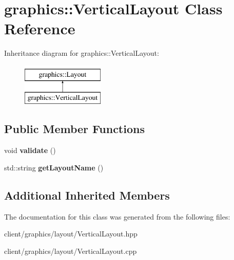 \hypertarget{classgraphics_1_1_vertical_layout}{\section{graphics\-:\-:Vertical\-Layout Class Reference}
\label{classgraphics_1_1_vertical_layout}
}
Inheritance diagram for graphics\-:\-:Vertical\-Layout\-:\begin{figure}[H]
\begin{center}
\leavevmode
\includegraphics[height=2.000000cm]{classgraphics_1_1_vertical_layout}
\end{center}
\end{figure}
\subsection*{Public Member Functions}
\begin{DoxyCompactItemize}
\item 
\hypertarget{classgraphics_1_1_vertical_layout_a5d38d25643909411dd9940c3dd179f0a}{void {\bfseries validate} ()}\label{classgraphics_1_1_vertical_layout_a5d38d25643909411dd9940c3dd179f0a}

\item 
\hypertarget{classgraphics_1_1_vertical_layout_a63b44c865f36b88bd0d54a63df880063}{std\-::string {\bfseries get\-Layout\-Name} ()}\label{classgraphics_1_1_vertical_layout_a63b44c865f36b88bd0d54a63df880063}

\end{DoxyCompactItemize}
\subsection*{Additional Inherited Members}


The documentation for this class was generated from the following files\-:\begin{DoxyCompactItemize}
\item 
client/graphics/layout/Vertical\-Layout.\-hpp\item 
client/graphics/layout/Vertical\-Layout.\-cpp\end{DoxyCompactItemize}
